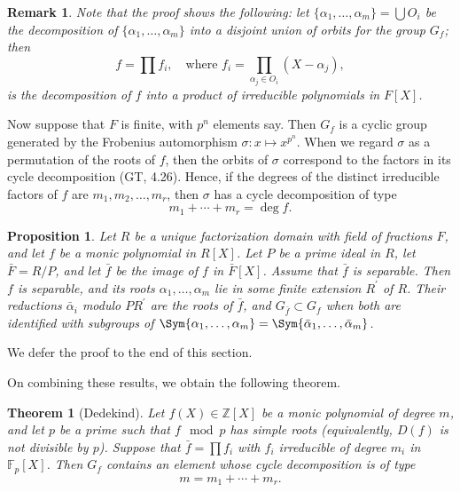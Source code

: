 \documentclass[a4paper,11pt,final,openany]{memoir}
\newtheorem{proposition}[X]{Proposition}
\newtheorem{theorem}[X]{Theorem}
\newtheorem{remark}[X]{Remark}
\theoremstyle{nonumberplain}
\begin{document}
\begin{remark}
\label{cg19m}Note that the proof shows the following: let $\{\alpha_{1}%
,\ldots,\alpha_{m}\}=\bigcup O_{i}$ be the decomposition of $\{\alpha
_{1},\ldots,\alpha_{m}\}$ into a disjoint union of orbits for the group
$G_{f}$; then%
\[
f=\prod f_{i},\quad\text{where }f_{i}=\prod_{\alpha_{j}\in O_{i}}(X-\alpha
_{j}),
\]
is the decomposition of $f$ into a product of irreducible polynomials in
$F[X]$.
\end{remark}

Now suppose that $F$ is finite, with $p^{n}$ elements say. Then $G_{f}$ is a
cyclic group generated by the Frobenius automorphism $\sigma\colon x\mapsto
x^{p^{n}}$. When we regard $\sigma$ as a permutation of the roots of $f$, then
the orbits of $\sigma$ correspond to the factors in its cycle decomposition
(GT, 4.26). Hence, if the degrees of the distinct irreducible factors
of $f$ are $m_{1},m_{2},\ldots,m_{r}$, then $\sigma$ has a cycle decomposition
of type
\[
m_{1}+\cdots+m_{r}=\deg f.
\]


\begin{proposition}
\label{cg20}Let $R$ be a unique factorization domain with field of fractions
$F$, and let $f$ be a monic polynomial in $R[X]$. Let $P$ be a prime ideal in
$R$, let $\bar{F}=R/P$, and let $\bar{f}$ be the image of $f$ in $\bar{F}[X]$.
Assume that $\bar{f}$ is separable. Then $f$ is separable, and its roots
$\alpha_{1},\ldots,\alpha_{m}$ lie in some finite extension $R^{\prime}$ of
$R$. Their reductions $\bar{\alpha}_{i}$ modulo $PR^{\prime}$ are the roots of
$\bar{f}$, and $G_{\bar{f}}\subset G_{f}$ when both are identified with
subgroups of $\Sym\{\alpha_{1},\ldots,\alpha_{m}\}=\Sym\{\bar{\alpha}%
_{1},\ldots,\bar{\alpha}_{m}\}$.
\end{proposition}

We defer the proof to the end of this section.

On combining these results, we obtain the following theorem.

\begin{theorem}
[Dedekind]\label{cg21}%
%
Let $f(X)\in\mathbb{Z}[X]$ be a monic polynomial of degree $m$, and let $p$ be
a prime such that $f\mod p$ has simple roots (equivalently, $D(f)$ is not
divisible by $p$). Suppose that $\bar{f}=\prod f_{i}$ with $f_{i}$ irreducible
of degree $m_{i}$ in $\mathbb{F}_{p}[X]$. Then $G_{f}$ contains an element
whose cycle decomposition is of type
\[
m=m_{1}+\cdots+m_{r}.
\]

\end{theorem}
\end{document}
